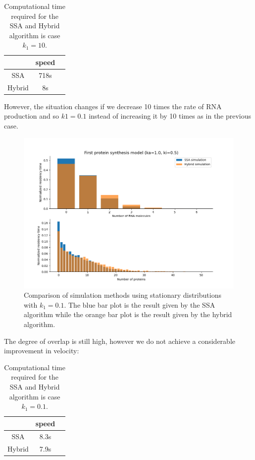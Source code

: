 \documentclass[12pt,a4paper]{report}
\begin{document}
\begin{table}[!h]
\begin{center}
\begin{tabular}{ |c|c|c| } 
 \hline
       & \textbf{speed} \\
 \hline
 SSA & 718s \\
 \hline
 Hybrid & 8s \\ 
 \hline
\end{tabular}
\caption{\label{tablek110}Computational time required for the SSA and Hybrid algorithm is case $k_{1}=10$.}
\end{center}
\end{table}


However, the situation changes if we decrease 10 times the rate of RNA production and so $k1=0.1$ instead of increasing it by 10 times as in the previous case.

\begin{figure}[!ht]
\centering
\includegraphics[scale=0.70]{ka1ki0.5SSA8.31sHybrid7.9stimelimit14000k10.1.png}
\caption{Comparison of simulation methods using stationary distributions with $k_{1}=0.1$. The blue bar plot is the result given by the SSA algorithm while the orange bar plot is the result given by the hybrid algorithm.}
\label{SSAHybridk10.1}
\end{figure}
\newpage
The degree of overlap is still high, however we do not achieve a considerable improvement in velocity:

\begin{table}[!h]
\begin{center}
\begin{tabular}{ |c|c|c| } 
 \hline
       & \textbf{speed} \\
 \hline
 SSA & 8.3s \\
 \hline
 Hybrid & 7.9s \\ 
 \hline
\end{tabular}
\caption{\label{tablek10.1}Computational time required for the SSA and Hybrid algorithm is case $k_{1}=0.1$.}
\end{center}
\end{table}
\end{document}
